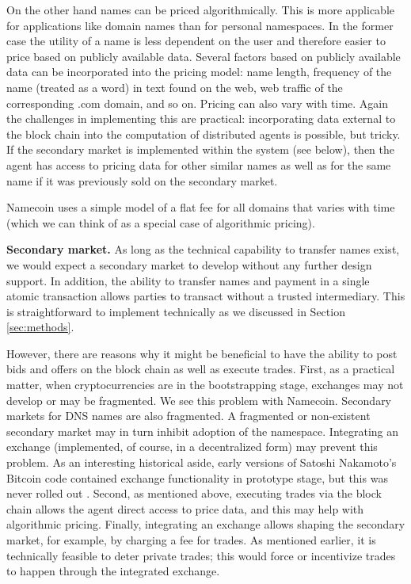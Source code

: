 On the other hand names can be priced algorithmically. This is more applicable for applications like domain names than for personal namespaces. In the former case the utility of a name is less dependent on the user and therefore easier to price based on publicly available data. Several factors based on publicly available data can be incorporated into the pricing model: name length, frequency of the name (treated as a word) in text found on the web, web traffic of the corresponding .com domain, and so on. Pricing can also vary with time. Again the challenges in implementing this are practical: incorporating data external to the block chain into the computation of distributed agents is possible, but tricky. If the secondary market is implemented within the system (see below), then the agent has access to pricing data for other similar names as well as for the same name if it was previously sold on the secondary market.


Namecoin uses a simple model of a flat fee for all domains that varies with time (which we can think of as a special case of algorithmic pricing).

{\bf Secondary market.} As long as the technical capability to transfer names exist, we would expect a secondary market to develop without any further design support. In addition, the ability to transfer names and payment in a single atomic transaction allows parties to transact without a trusted intermediary. This is straightforward to implement technically as we discussed in Section \ref{sec:methods}. 

However, there are reasons why it might be beneficial to have the ability to post bids and offers on the block chain as well as execute trades. First, as a practical matter, when cryptocurrencies are in the bootstrapping stage, exchanges may not develop or may be fragmented. We see this problem with Namecoin. Secondary markets for DNS names are also fragmented. A fragmented or non-existent secondary market may in turn inhibit adoption of the namespace. Integrating an exchange (implemented, of course, in a decentralized form) may prevent this problem. As an interesting historical aside, early versions of Satoshi Nakamoto's Bitcoin code contained exchange functionality in prototype stage, but this was never rolled out \cite{}.  Second, as mentioned above, executing trades via the block chain allows the agent direct access to price data, and this may help with algorithmic pricing. Finally, integrating an exchange allows shaping  the secondary market, for example, by charging a fee for trades. As mentioned earlier, it is technically feasible to deter private trades; this would force or incentivize trades to happen through the integrated exchange.


